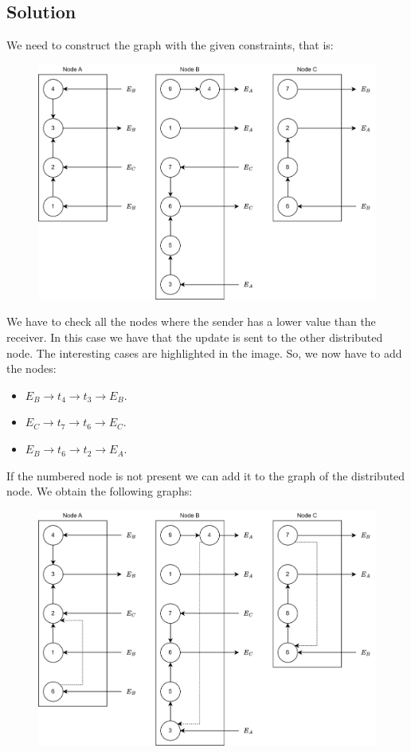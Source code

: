 \subsection*{Solution}
We need to construct the graph with the given constraints, that is: 
\begin{figure}[H]
    \centering
    \includegraphics[width=0.6\linewidth]{images/Ob1.png}
\end{figure}
We have to check all the nodes where the sender has a lower value than the receiver. 
In this case we have that the update is sent to the other distributed node. 
The interesting cases are highlighted in the image. 
So, we now have to add the nodes: 
\begin{itemize}
    \item $E_B \rightarrow t_4 \rightarrow t_3 \rightarrow E_B$.
    \item $E_C \rightarrow t_7 \rightarrow t_6 \rightarrow E_C$.
    \item $E_B \rightarrow t_6 \rightarrow t_2 \rightarrow E_A$.
\end{itemize}
If the numbered node is not present we can add it to the graph of the distributed node. 
We obtain the following graphs: 
\begin{figure}[H]
    \centering
    \includegraphics[width=0.75\linewidth]{images/Ob2.png}
\end{figure}
